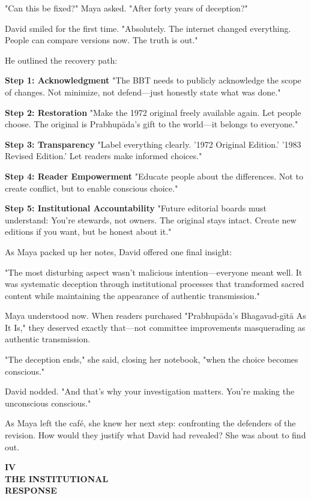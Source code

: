 \documentclass[11pt,twoside]{book}
\makeatletter
\def\cleardoublepage{\clearpage\if@twoside \ifodd\c@page\else\hbox{}\thispagestyle{empty}\newpage\if@twocolumn\hbox{}\newpage\fi\fi\fi}
\makeatother
\begin{document}
"Can this be fixed?" Maya asked. "After forty years of deception?"

David smiled for the first time. "Absolutely. The internet changed everything. People can compare versions now. The truth is out."

He outlined the recovery path:

\textbf{\textbf{Step 1: Acknowledgment}}
"The BBT needs to publicly acknowledge the scope of changes. Not minimize, not defend—just honestly state what was done."

\textbf{\textbf{Step 2: Restoration}}
"Make the 1972 original freely available again. Let people choose. The original is Prabhupāda's gift to the world—it belongs to everyone."

\textbf{\textbf{Step 3: Transparency}}
"Label everything clearly. '1972 Original Edition.' '1983 Revised Edition.' Let readers make informed choices."

\textbf{\textbf{Step 4: Reader Empowerment}}
"Educate people about the differences. Not to create conflict, but to enable conscious choice."

\textbf{\textbf{Step 5: Institutional Accountability}}
"Future editorial boards must understand: You're stewards, not owners. The original stays intact. Create new editions if you want, but be honest about it."

As Maya packed up her notes, David offered one final insight:

"The most disturbing aspect wasn't malicious intention—everyone meant well. It was systematic deception through institutional processes that transformed sacred content while maintaining the appearance of authentic transmission."

Maya understood now. When readers purchased "Prabhupāda's Bhagavad-gītā As It Is," they deserved exactly that—not committee improvements masquerading as authentic transmission.

"The deception ends," she said, closing her notebook, "when the choice becomes conscious."

David nodded. "And that's why your investigation matters. You're making the unconscious conscious."

As Maya left the café, she knew her next step: confronting the defenders of the revision. How would they justify what David had revealed? She was about to find out.

\cleardoublepage
\thispagestyle{empty}
\vspace*{0.25\textheight}
\begin{center}
{\Huge\bfseries\MakeUppercase{\textbf{IV}}}\\[0.5cm]
{\huge\bfseries THE INSTITUTIONAL}\\[0.5cm]
{\huge\bfseries RESPONSE}
\end{center}
\vspace*{\fill}
\clearpage
\thispagestyle{empty} %
\mbox{}
\newpage
\end{document}
